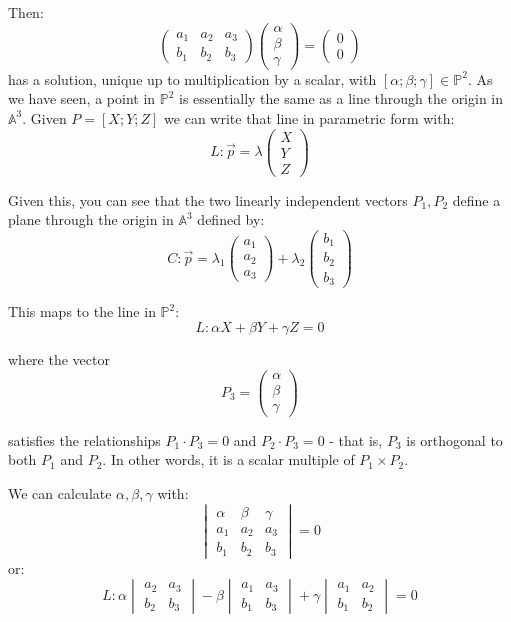 \documentclass{article}
\begin{document}
Then:
\[
\begin{pmatrix}
a_1 & a_2 & a_3 \\
b_1 & b_2 & b_3
\end{pmatrix} \begin{pmatrix}
\alpha \\ \beta \\ \gamma
\end{pmatrix} = \begin{pmatrix}
0 \\ 0
\end{pmatrix} 
\]
has a solution, unique up to multiplication by a scalar, with $[\alpha; \beta; \gamma] \in \mathbb{P}^2$.
As we have seen, a point in $\mathbb{P}^2$ is essentially the same as a line through the
origin in $\mathbb{A}^3$. Given $P=[X;Y;Z]$ we can write that line in parametric form with:
\[ L: \vec{p} = \lambda \begin{pmatrix} X \\ Y \\ Z \end{pmatrix} \]

Given this, you can see that the two linearly independent vectors $P_1, P_2$ define a plane 
through the origin in $\mathbb{A}^3$ defined by:
\[ C: \vec{p} = \lambda_1 \begin{pmatrix} a_1 \\ a_2 \\ a_3 \end{pmatrix} 
+ \lambda_2 \begin{pmatrix} b_1 \\ b_2 \\ b_3 \end{pmatrix}\]

This maps to the line in $\mathbb{P}^2$:
\[ L: \alpha X + \beta Y + \gamma Z = 0 \]

where the vector 
\[P_3 = \begin{pmatrix} \alpha \\ \beta \\ \gamma \end{pmatrix} \]

satisfies the relationships $P_1 \cdot P_3 = 0$ and $P_2 \cdot P_3 = 0$ - that is,
$P_3$ is orthogonal to both $P_1$ and $P_2$. In other words, it is a scalar multiple
of $P_1 \times P_2$.

We can calculate $\alpha, \beta, \gamma$ with:
\[ \begin{vmatrix} \alpha & \beta & \gamma \\
a_1 & a_2 & a_3 \\
b_1 & b_2 & b_3 \end{vmatrix} = 0 \]
or:
\[L: \alpha \begin{vmatrix} a_2 & a_3 \\ b_2 & b_3 \end{vmatrix}
- \beta  \begin{vmatrix} a_1 & a_3 \\ b_1 & b_3 \end{vmatrix}
+ \gamma \begin{vmatrix} a_1 & a_2 \\ b_1 & b_2 \end{vmatrix} = 0\]
\end{document}
